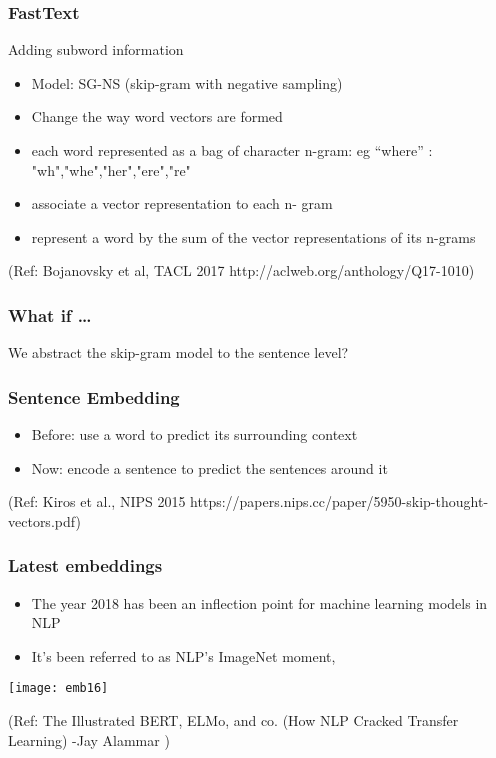 \begin{frame}[fragile]\frametitle{FastText}
Adding subword information
\begin{itemize}
\item  Model: SG-NS (skip-gram with negative sampling)
\item Change the way word vectors are formed
\item  each word represented as a bag of character 
n-gram: eg ``where'' : "wh","whe","her","ere","re"
\item  associate a vector representation to each n-
gram 
\item  represent a word by the sum of the vector 
representations of its n-grams
\end{itemize}

{\tiny (Ref: Bojanovsky et al, TACL 2017 http://aclweb.org/anthology/Q17-1010)}

\end{frame}

\begin{frame}[fragile]\frametitle{What if \ldots}
We abstract the skip-gram 
model to the sentence level?
\end{frame}

\begin{frame}[fragile]\frametitle{Sentence Embedding}

\begin{itemize}
\item  Before: use a word to predict its 
surrounding context
\item Now: encode a sentence to predict 
the sentences around it 
\end{itemize}

{\tiny (Ref: Kiros et al., NIPS 2015 https://papers.nips.cc/paper/5950-skip-thought-vectors.pdf)}
\end{frame}

\begin{frame}[fragile]\frametitle{Latest embeddings}

\begin{itemize}
\item  The year 2018 has been an inflection point for machine learning models in NLP 
\item It’s been referred to as NLP’s ImageNet moment,
\end{itemize}

\begin{center}
\texttt{[image: emb16]}
\end{center}

{\tiny (Ref: The Illustrated BERT, ELMo, and co. (How NLP Cracked Transfer Learning) -Jay Alammar )}
\end{frame}

